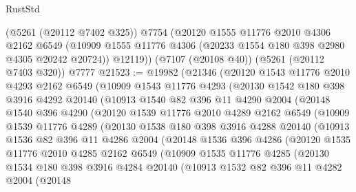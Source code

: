 \begin{lexlean}{RustStd}
\begin{coremodule}
      (@5261 (@20112 @7402 @325))
      @7754
      (@20120
        @1555
        @11776
        @2010
        @4306
        @2162
        @6549
        (@10909 @1555 @11776 @4306 (@20233 @1554 @180 @398 @2980 @4305 @20242 @20724))
        @12119))
    (@7107 (@20108 @40))
    (@5261 (@20112 @7403 @320))
    @7777
@21523 := @19982
    (@21346
      (@20120
        @1543
        @11776
        @2010
        @4293
        @2162
        @6549
        (@10909
          @1543
          @11776
          @4293
          (@20130
            @1542
            @180
            @398
            @3916
            @4292
            @20140
            (@10913
              @1540
              @82
              @396
              @11
              @4290
              @2004
              (@20148
                @1540
                @396
                @4290
                (@20120
                  @1539
                  @11776
                  @2010
                  @4289
                  @2162
                  @6549
                  (@10909
                    @1539
                    @11776
                    @4289
                    (@20130
                      @1538
                      @180
                      @398
                      @3916
                      @4288
                      @20140
                      (@10913
                        @1536
                        @82
                        @396
                        @11
                        @4286
                        @2004
                        (@20148
                          @1536
                          @396
                          @4286
                          (@20120
                            @1535
                            @11776
                            @2010
                            @4285
                            @2162
                            @6549
                            (@10909
                              @1535
                              @11776
                              @4285
                              (@20130
                                @1534
                                @180
                                @398
                                @3916
                                @4284
                                @20140
                                (@10913
                                  @1532
                                  @82
                                  @396
                                  @11
                                  @4282
                                  @2004
                                  (@20148

\end{coremodule}
\end{lexlean}
